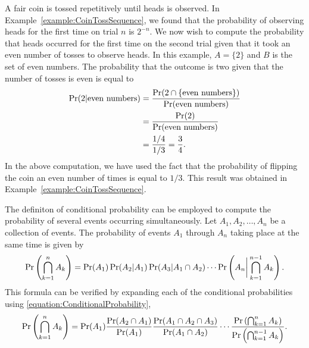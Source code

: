 \begin{example}
A fair coin is tossed repetitively until heads is observed.
In Example~\ref{example:CoinTossSequence}, we found that the probability of observing heads for the first time on trial $n$ is $2^{-n}$.
We now wish to compute the probability that heads occurred for the first time on the second trial given that it took an even number of tosses to observe heads.
In this example, $A = \{ 2 \}$ and $B$ is the set of even numbers.
The probability that the outcome is two given that the number of tosses is even is equal to
\begin{equation*}
\begin{split}
\Pr ( 2 | \text{even numbers} )
&= \frac{\Pr ( 2 \cap \{ \text{even numbers} \} )}
{\Pr (\text{even numbers})} \\
&= \frac{\Pr (2)}{\Pr (\text{even numbers})} \\
&= \frac{1/4}{1/3}
= \frac{3}{4} .
\end{split}
\end{equation*}
In the above computation, we have used the fact that the probability of flipping the coin an even number of times is equal to $1/3$.
This result was obtained in Example~\ref{example:CoinTossSequence}.
\end{example}

The definiton of conditional probability can be employed to compute the probability of several events occurring simultaneously.
Let $A_1, A_2, \ldots, A_n$ be a collection of events.
The probability of events $A_1$ through $A_n$ taking place at the same time is given by
\begin{equation} \label{equation:SimultaneousEvents}
\Pr \left( \bigcap_{k=1}^n A_k \right)
= \Pr (A_1) \Pr (A_2 | A_1) \Pr (A_3 | A_1 \cap A_2)
\cdots \Pr \left( A_n \bigg| \bigcap_{k=1}^{n-1} A_k \right) .
\end{equation}
This formula can be verified by expanding each of the conditional probabilities using \eqref{equation:ConditionalProbability},
\begin{equation*}
\Pr \left( \bigcap_{k=1}^n A_k \right)
= \Pr (A_1) \frac{\Pr (A_2 \cap A_1)}{\Pr (A_1)}
\frac{\Pr (A_1 \cap A_2 \cap A_3)}{\Pr (A_1 \cap A_2)}
\cdots \frac{\Pr \left( \bigcap_{k=1}^{n} A_k \right)}
{\Pr \left( \bigcap_{k=1}^{n-1} A_k \right)} .
\end{equation*}

